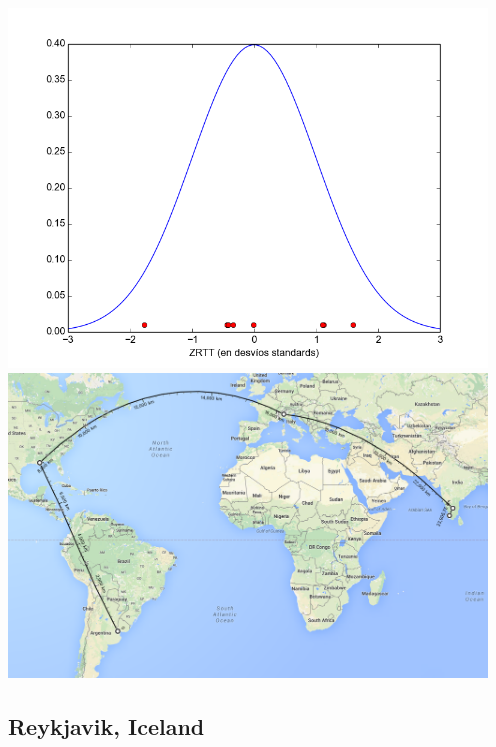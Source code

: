 \includegraphics[width=5in]{imgs/cusat_dist.png}
\includegraphics[width=5in]{imgs/maps/cusat.png}

\subsection{Reykjavik, Iceland}

